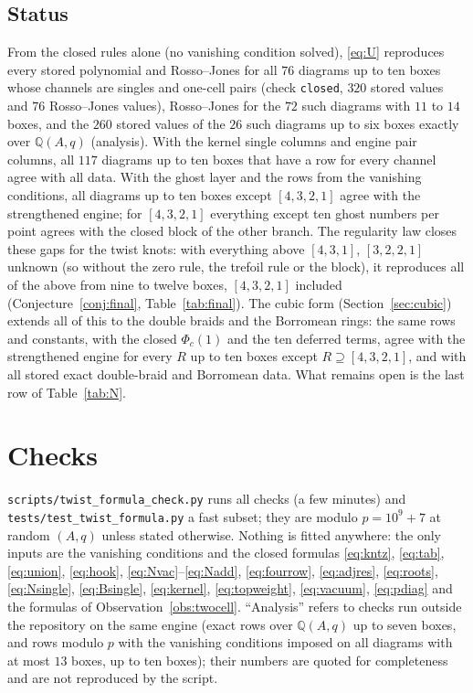 \documentclass[11pt]{article}
\newcommand{\LMPH}[1]{\texttt{#1}}
\begin{document}
\subsection{Status}

From the closed rules alone (no vanishing condition solved), \eqref{eq:U} reproduces every stored polynomial and
Rosso--Jones for all $76$ diagrams up to ten boxes whose channels are singles and one-cell pairs (check \LMPH{closed},
$320$ stored values and $76$ Rosso--Jones values), Rosso--Jones for the $72$ such diagrams with $11$ to $14$ boxes, and the
$260$ stored values of the $26$ such diagrams up to six boxes exactly over $\mathbb Q(A,q)$ (analysis).  With the kernel
single columns and engine pair columns, all $117$ diagrams up to ten boxes that have a row for every channel agree with all
data.  With the ghost layer and the rows from the vanishing conditions, all diagrams up to ten boxes except $[4,3,2,1]$
agree with the strengthened engine; for $[4,3,2,1]$ everything except ten ghost numbers per point agrees with the closed
block of the other branch.  The regularity law closes these gaps for the twist knots: with everything above $[4,3,1]$,
$[3,2,2,1]$ unknown (so without the zero rule, the trefoil rule or the block), it reproduces all of the above from nine to
twelve boxes, $[4,3,2,1]$ included (Conjecture~\ref{conj:final}, Table~\ref{tab:final}).  The cubic form (Section~\ref{sec:cubic}) extends all of this to the double braids and the
Borromean rings: the same rows and constants, with the closed $\Phi_c(1)$ and the ten deferred terms, agree with the
strengthened engine for every $R$ up to ten boxes except $R\supseteq[4,3,2,1]$, and with all stored exact double-braid and
Borromean data.  What remains open is the last row of Table~\ref{tab:N}.

\section{Checks}\label{sec:checks}

\LMPH{scripts/twist\_formula\_check.py} runs all checks (a few minutes) and \LMPH{tests/test\_twist\_formula.py} a fast
subset; they are modulo $p=10^9+7$ at random $(A,q)$ unless stated otherwise.  Nothing is fitted anywhere: the only inputs are the vanishing conditions and the closed formulas
\eqref{eq:kntz}, \eqref{eq:tab}, \eqref{eq:union}, \eqref{eq:hook}, \eqref{eq:Nvac}--\eqref{eq:Nadd}, \eqref{eq:fourrow},
\eqref{eq:adjres}, \eqref{eq:roots}, \eqref{eq:Nsingle}, \eqref{eq:Bsingle}, \eqref{eq:kernel}, \eqref{eq:topweight},
\eqref{eq:vacuum}, \eqref{eq:pdiag} and the formulas of Observation~\ref{obs:twocell}.  ``Analysis''
refers to checks run outside the repository on the same engine (exact rows over $\mathbb Q(A,q)$ up to seven boxes,
and rows modulo $p$ with the vanishing conditions imposed on all diagrams with at most $13$ boxes, up to ten boxes);
their numbers are quoted for completeness and are not reproduced by the script.
\end{document}
